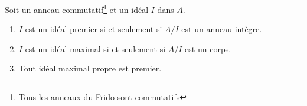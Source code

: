 \begin{proposition}      \label{PROPooRUQKooIfbnQX}
	Soit un anneau commutatif\footnote{Tous les anneaux du Frido sont commutatifs} et un idéal \( I\) dans \( A\).
	\begin{enumerate}
		\item       \label{ITEMooUGBTooOGrnWl}
		      \( I\) est un idéal premier si et seulement si \( A/I\) est un anneau intègre.
		\item   \label{ITEMooGLXSooUjINqR}
		      \( I\) est un idéal maximal si et seulement si \( A/I\) est un corps.
		\item       \label{ITEMooTFFQooOUajFw}
		      Tout idéal maximal propre est premier.
	\end{enumerate}
\end{proposition}

